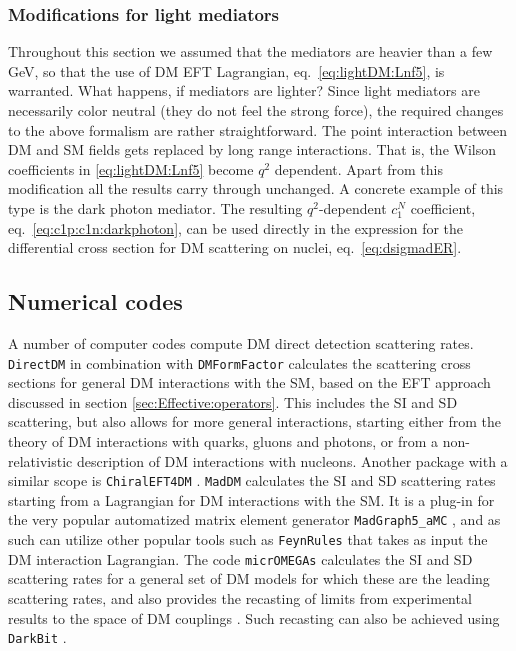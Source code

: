 \subsubsection{Modifications for light mediators}
Throughout this section we assumed that the mediators are heavier than a few GeV, so that the use of DM EFT Lagrangian, eq.~\eqref{eq:lightDM:Lnf5}, is warranted. 
What happens, if mediators are lighter? Since light mediators are necessarily color neutral 
(they do not feel the strong force), the required changes to the above formalism are rather straightforward. The point interaction between DM and SM fields gets replaced by long range interactions. That is, the Wilson coefficients in \eqref{eq:lightDM:Lnf5} become $q^2$ dependent. Apart from this modification all the results carry through unchanged. A concrete example of this type is the dark photon mediator. The resulting $q^2$-dependent $c_1^N$ coefficient, eq.~\eqref{eq:c1p:c1n:darkphoton}, can be used directly in the expression for the differential cross section for DM scattering on nuclei, eq.~\eqref{eq:dsigmadER}.

\subsection{Numerical codes}
A number of computer codes compute DM direct detection scattering rates. {\tt DirectDM} \cite{Bishara:2017nnn} in combination with {\tt DMFormFactor} \cite{Anand:2013yka} calculates the scattering cross sections for general DM interactions with the SM, based on the EFT approach discussed in section \ref{sec:Effective:operators}. This includes the SI and SD scattering, but also allows for more general interactions, starting either from the theory of DM interactions with quarks, gluons and photons, or from a non-relativistic description of DM interactions with nucleons. Another package with a similar scope is {\tt ChiralEFT4DM} \cite{Hoferichter:2018acd}. {\tt MadDM}  \cite{MadDM} calculates the SI and SD scattering rates starting from a Lagrangian for DM interactions with the SM. It is a plug-in for the very popular automatized matrix element generator {\tt MadGraph5\_aMC\@NLO} \cite{Alwall:2014hca}, and as such can utilize other popular tools such as {\tt FeynRules} \cite{Alloul:2013bka} that takes as input the DM interaction Lagrangian. 
The code {\tt micrOMEGAs} \cite{0803.2360} calculates the SI and SD scattering rates for a general set of DM models for which these are the leading scattering rates, and also provides the recasting of limits from experimental results to the space of DM couplings \cite{Belanger:2020gnr}. Such recasting can also be achieved using {\tt DarkBit} \cite{GAMBITDarkMatterWorkgroup:2017fax}.


